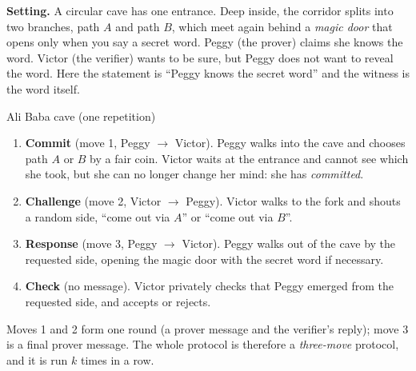 \documentclass[11pt,a4paper]{report}
\theoremstyle{plain}
\theoremstyle{definition}
\theoremstyle{remark}
\begin{document}
\textbf{Setting.} A circular cave has one entrance. Deep inside, the corridor splits into two branches, path $A$ and path $B$, which meet again behind a \emph{magic door} that opens only when you say a secret word. Peggy (the prover) claims she knows the word. Victor (the verifier) wants to be sure, but Peggy does not want to reveal the word. Here the statement is ``Peggy knows the secret word'' and the witness is the word itself.

\begin{center}
\end{center}

\begin{protocol}{Ali Baba cave (one repetition)}
\begin{enumerate}[leftmargin=1.4em]
\item \textbf{Commit} (move 1, Peggy $\to$ Victor). Peggy walks into the cave and chooses path $A$ or $B$ by a fair coin. Victor waits at the entrance and cannot see which she took, but she can no longer change her mind: she has \emph{committed}.
\item \textbf{Challenge} (move 2, Victor $\to$ Peggy). Victor walks to the fork and shouts a random side, ``come out via $A$'' or ``come out via $B$''.
\item \textbf{Response} (move 3, Peggy $\to$ Victor). Peggy walks out of the cave by the requested side, opening the magic door with the secret word if necessary.
\item \textbf{Check} (no message). Victor privately checks that Peggy emerged from the requested side, and accepts or rejects.
\end{enumerate}
Moves 1 and 2 form one round (a prover message and the verifier's reply); move 3 is a final prover message. The whole protocol is therefore a \emph{three-move} protocol, and it is run $k$ times in a row.
\end{protocol}
\end{document}
